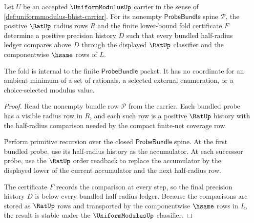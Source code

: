 \begin{theorem}
\label{thm:uniformmodulus-finite-probebundle-fold}
Let $U$ be an accepted $\UniformModulusUp$ carrier in the sense of \autoref{def:uniformmodulus-bhist-carrier}. For its nonempty $\mathsf{ProbeBundle}$ spine $\mathcal{P}$, the positive $\RatUp$ radius rows $R$ and the finite lower-bound fold certificate $F$ determine a positive precision history $D$ such that every bundled half-radius ledger compares above $D$ through the displayed $\RatUp$ classifier and the componentwise $\hsame$ rows of $L$.

The fold is internal to the finite $\mathsf{ProbeBundle}$ packet. It has no coordinate for an ambient minimum of a set of rationals, a selected external enumeration, or a choice-selected modulus value.
\end{theorem}
\begin{proof}
Read the nonempty bundle row $\mathcal{P}$ from the carrier. Each bundled probe has a visible radius row in $R$, and each such row is a positive $\RatUp$ history with the half-radius comparison needed by the compact finite-net coverage row.

Perform primitive recursion over the closed $\mathsf{ProbeBundle}$ spine. At the first bundled probe, use its half-radius history as the accumulator. At each successor probe, use the $\RatUp$ order readback to replace the accumulator by the displayed lower of the current accumulator and the next half-radius row.

The certificate $F$ records the comparison at every step, so the final precision history $D$ is below every bundled half-radius ledger. Because the comparisons are stored as $\RatUp$ rows and transported by the componentwise $\hsame$ rows in $L$, the result is stable under the $\UniformModulusUp$ classifier.
\end{proof}

